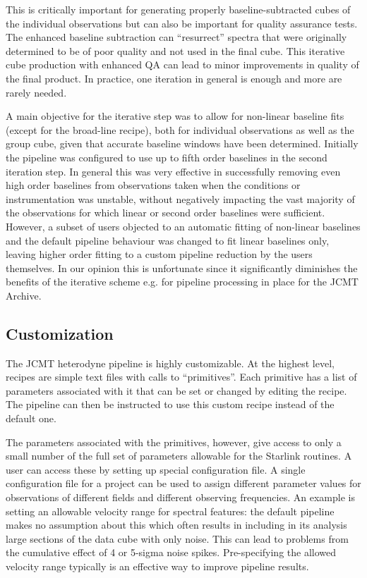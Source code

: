 \documentclass[final,authoryear,5p,times,twocolumn]{elsarticle}
\begin{document}
This is critically important for generating properly baseline-subtracted 
cubes of the individual observations but can also
be important for quality assurance tests. The enhanced baseline
subtraction can ``resurrect'' spectra that were originally determined
to be of poor quality and not used in the final cube. This iterative
cube production with enhanced QA can lead to minor improvements in
quality of the final product.  In practice,  one iteration in general is enough 
and more are rarely needed.

A main objective for the iterative step was to allow for non-linear baseline fits 
(except for the broad-line recipe), both for  individual observations as well as 
the group cube, given that accurate baseline windows have been determined.
Initially the pipeline was configured to use up to fifth order baselines in 
the second iteration step. In general this was very effective in successfully 
removing even high order baselines from observations taken when the 
conditions or instrumentation was unstable, without negatively impacting
the vast majority of the observations for which linear or second order baselines
were sufficient.  However, a subset of users objected to an automatic fitting of 
non-linear baselines and the default pipeline behaviour was changed to 
fit linear baselines only, leaving higher order fitting to a custom pipeline reduction
by the users themselves.  In our opinion this is unfortunate since it significantly
diminishes the benefits of the iterative scheme e.g. for pipeline processing
in place for the JCMT Archive.

\subsection{Customization}

The JCMT heterodyne pipeline is highly customizable. At the highest level, recipes 
are simple text files with calls to ``primitives''. Each primitive has a list of
parameters associated with it that can be set or changed by editing the recipe.
The pipeline can then be instructed to use this custom recipe instead of the default one.

The parameters associated with the primitives, however, give access to only a small
number of the full set of parameters allowable for the Starlink routines. A user can access
these by setting up  special configuration file. A single configuration file for a project can
be used to assign different parameter values for observations of different fields and
different observing frequencies. An example is setting an allowable velocity range for
spectral features: the default pipeline makes no assumption about this which often results
in including in its analysis large sections of the data cube with only noise. This can lead
to problems from the cumulative effect of 4 or 5-sigma noise spikes. Pre-specifying the
allowed velocity range typically is an effective way to improve pipeline results.
\end{document}
